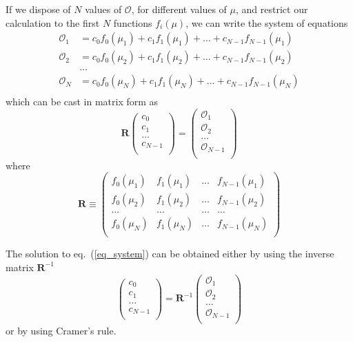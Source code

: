 \documentclass[final]{article}
\begin{document}
If we dispose of $N$ values of $\mathcal{O}$, for different values of $\mu$, and restrict our calculation to the first $N$ functions $f_i(\mu)$, we can write the system of equations 
\begin{equation}
\begin{split}
\mathcal{O}_1 &=   c_0 f_0(\mu_1) + c_1 f_1(\mu_1) + \dots  + c_{N-1} f_{N-1}(\mu_1) \\
\mathcal{O}_2 &=   c_0 f_0(\mu_2) + c_1 f_1(\mu_2) + \dots  + c_{N-1} f_{N-1}(\mu_2) \\
&\dots \\
\mathcal{O}_N &=   c_0 f_0(\mu_N) + c_1 f_1(\mu_N) + \dots  + c_{N-1} f_{N-1}(\mu_N) \\
\end{split}
\label{eq_system}
\end{equation}
which can be cast in matrix form as
\begin{equation}
\mathbf{R} \left(
\begin{array}{c}
c_0 \\
c_1 \\
\dots \\
c_{N-1} \\
\end{array}
\right) = \left(
\begin{array}{c}
\mathcal{O}_1  \\
\mathcal{O}_2 \\
	\dots \\
\mathcal{O}_{N-1}\\
\end{array}
\right) 
\end{equation}
where 
\begin{equation}
\mathbf{R} \equiv \left( 
\begin{array}{cccc}
f_0(\mu_1) & f_1(\mu_1) & \dots & f_{N-1}(\mu_1) \\
f_0(\mu_2) & f_1(\mu_2) & \dots & f_{N-1}(\mu_2) \\
\dots  & \dots  & \dots  & \dots  \\
f_0(\mu_N) & f_1(\mu_N) & \dots & f_{N-1}(\mu_N) \\
\end{array}
\right)
\end{equation}

The solution to eq.~(\ref{eq_system}) can be obtained either by using the inverse matrix $\mathbf{R}^{-1}$
\begin{equation}
 \left(
\begin{array}{c}
	c_0 \\
	c_1 \\
	\dots \\
	c_{N-1} \\
\end{array}
\right) = \mathbf{R}^{-1} \left(
\begin{array}{c}
	\mathcal{O}_1  \\
	\mathcal{O}_2 \\
	\dots \\
	\mathcal{O}_{N-1}\\
\end{array}
\right) 
\end{equation}
or by using Cramer's  rule.
\end{document}
